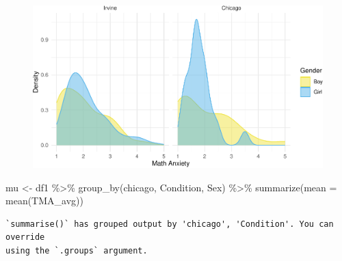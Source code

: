 \documentclass[
  letterpaper,
  DIV=11,
  numbers=noendperiod]{scrartcl}
\newenvironment{Shaded}{\begin{snugshade}}{\end{snugshade}}
\newcommand{\AttributeTok}[1]{\textcolor[rgb]{0.49,0.56,0.16}{#1}}
\newcommand{\FunctionTok}[1]{\textcolor[rgb]{0.02,0.16,0.49}{#1}}
\newcommand{\NormalTok}[1]{\textcolor[rgb]{0.00,0.44,0.13}{#1}}
\newcommand{\OtherTok}[1]{\textcolor[rgb]{0.00,0.44,0.13}{#1}}
\newcommand{\SpecialCharTok}[1]{\textcolor[rgb]{0.25,0.44,0.63}{#1}}
\begin{document}
\begin{figure}[H]

{\centering \includegraphics{modeling3_files/figure-pdf/unnamed-chunk-4-1.pdf}

}

\end{figure}

\begin{Shaded}
\begin{Highlighting}[]
\NormalTok{mu }\OtherTok{\textless{}{-}}\NormalTok{ df1 }\SpecialCharTok{\%\textgreater{}\%} \FunctionTok{group\_by}\NormalTok{(chicago, Condition, Sex) }\SpecialCharTok{\%\textgreater{}\%} \FunctionTok{summarize}\NormalTok{(}\AttributeTok{mean =} \FunctionTok{mean}\NormalTok{(TMA\_avg))}
\end{Highlighting}
\end{Shaded}

\begin{verbatim}
`summarise()` has grouped output by 'chicago', 'Condition'. You can override
using the `.groups` argument.
\end{verbatim}
\end{document}
